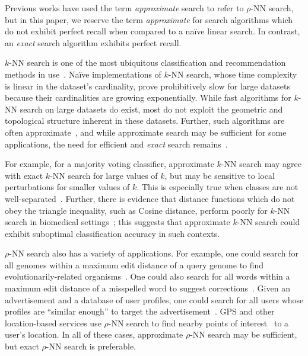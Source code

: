 Previous works have used the term \textit{approximate} search to refer to $\rho$-NN search, but in this paper, we reserve the term \textit{approximate} for search algorithms which do not exhibit perfect recall when compared to a na\"{i}ve linear search.
In contrast, an \textit{exact} search algorithm exhibits perfect recall.

$k$-NN search is one of the most ubiquitous classification and recommendation methods in use~\cite{fix1952discriminatory, cover1967nearest}.
Na\"{i}ve implementations of $k$-NN search, whose time complexity is linear in the dataset's cardinality, prove prohibitively slow for large datasets because their cardinalities are growing exponentially.
While fast algorithms for $k$-NN search on large datasets do exist, most do not exploit the geometric and topological structure inherent in these datasets.
Further, such algorithms are often approximate~\cite{gao2023high}, and while approximate search may be sufficient for some applications, the need for efficient and \textit{exact} search remains~\cite{ukey2023survey}.

For example, for a majority voting classifier, approximate $k$-NN search may agree with exact $k$-NN search for large values of $k$, but may be sensitive to local perturbations for smaller values of $k$.
This is especially true when classes are not well-separated~\cite{zhang2022imbalanced}.
Further, there is evidence that distance functions which do not obey the triangle inequality, such as Cosine distance, perform poorly for $k$-NN search in biomedical settings~\cite{hu2016distance};
this suggests that approximate $k$-NN search could exhibit suboptimal classification accuracy in such contexts.

$\rho$-NN search also has a variety of applications.
For example, one could search for all genomes within a maximum edit distance of a query genome to find evolutionarily-related organisms~\cite{budowski2010fragbag}.
One could also search for all words within a maximum edit distance of a misspelled word to suggest corrections~\cite{ukkonen1985algorithms}.
Given an advertisement and a database of user profiles, one could search for all users whose profiles are ``similar enough'' to target the advertisement~\cite{zhang2020privacy}.
GPS and other location-based services use $\rho$-NN search to find nearby points of interest~\cite{zhang2020privacy} to a user's location.
In all of these cases, approximate $\rho$-NN search may be sufficient, but exact $\rho$-NN search is preferable.

